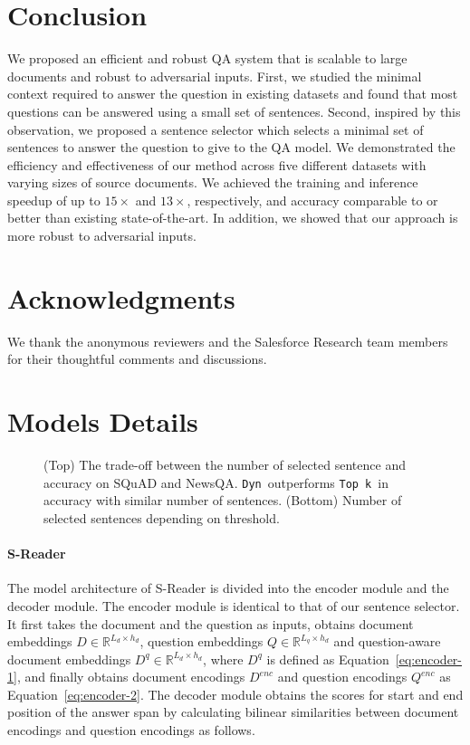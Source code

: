 \documentclass[11pt,a4paper]{article}
\newcommand{\topk}{{\tt Top k}}
\newcommand{\dyn}{{\tt Dyn}}
\begin{document}
 \section{Conclusion}\label{sec:concl}We proposed an efficient and robust QA system that is scalable to large documents and robust to adversarial inputs.
First, we studied the minimal context required to answer the question in existing datasets and found that most questions can be answered using a small set of sentences.
Second, inspired by this observation, we proposed a sentence selector which selects a minimal set of sentences to answer the question to give to the QA model.
We demonstrated the efficiency and effectiveness of our method across five different datasets with varying sizes of source documents.
We achieved the training and inference speedup of up to $15\times$ and $13\times$, respectively, and accuracy comparable to or better than existing state-of-the-art.
In addition, we showed that our approach is more robust to adversarial inputs. 
\section*{Acknowledgments}
We thank the anonymous reviewers and the Salesforce Research team members for their thoughtful comments and discussions.




\clearpage

\appendix
\section{Models Details}\label{sec:app-details}\begin{figure*}[pht]
\centering
{}
\caption{
(Top) The trade-off between the number of selected sentence and accuracy on SQuAD and NewsQA. \dyn~outperforms \topk~in accuracy with similar number of sentences. (Bottom) Number of selected sentences depending on threshold.
}
\label{fig:thresholding}
\end{figure*}

\paragraph{S-Reader}
The model architecture of S-Reader is divided into the encoder module and the decoder module. The encoder module is identical to that of our sentence selector. It first takes the document and the question as inputs, obtains document embeddings $D \in \mathbb{R}^{L_d \times h_d}$, question embeddings $Q \in \mathbb{R}^{L_q \times h_d}$ and question-aware document embeddings $D^q \in \mathbb{R}^{L_d \times h_d}$, where $D^q$ is defined as Equation~\ref{eq:encoder-1}, and finally obtains document encodings $D^{enc}$ and question encodings $Q^{enc}$ as Equation~\ref{eq:encoder-2}.
The decoder module obtains the scores for start and end position of the answer span by calculating bilinear similarities between document encodings and question encodings as follows.
\end{document}

